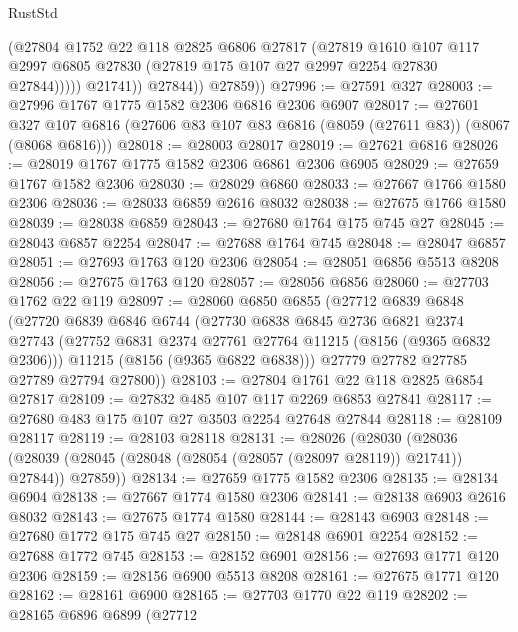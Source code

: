 \begin{lexlean}{RustStd}
\begin{coremodule}
{\begin{coremodule}
{{{{{{{{{{{{{{{{{{{{{{{{{{{{{{{{{{                    (@27804
                      @1752
                      @22
                      @118
                      @2825
                      @6806
                      @27817
                      (@27819
                        @1610
                        @107
                        @117
                        @2997
                        @6805
                        @27830
                        (@27819 @175 @107 @27 @2997 @2254 @27830 @27844)))))
                @21741))
            @27844))
        @27859))
@27996 := @27591 @327
@28003 := @27996 @1767 @1775 @1582 @2306 @6816 @2306 @6907
@28017 := @27601
    @327
    @107
    @6816
    (@27606 @83 @107 @83 @6816 (@8059 (@27611 @83)) (@8067 (@8068 @6816)))
@28018 := @28003 @28017
@28019 := @27621 @6816
@28026 := @28019 @1767 @1775 @1582 @2306 @6861 @2306 @6905
@28029 := @27659 @1767 @1582 @2306
@28030 := @28029 @6860
@28033 := @27667 @1766 @1580 @2306
@28036 := @28033 @6859 @2616 @8032
@28038 := @27675 @1766 @1580
@28039 := @28038 @6859
@28043 := @27680 @1764 @175 @745 @27
@28045 := @28043 @6857 @2254
@28047 := @27688 @1764 @745
@28048 := @28047 @6857
@28051 := @27693 @1763 @120 @2306
@28054 := @28051 @6856 @5513 @8208
@28056 := @27675 @1763 @120
@28057 := @28056 @6856
@28060 := @27703 @1762 @22 @119
@28097 := @28060
    @6850
    @6855
    (@27712
      @6839
      @6848
      (@27720
        @6839
        @6846
        @6744
        (@27730
          @6838
          @6845
          @2736
          @6821
          @2374
          @27743
          (@27752 @6831 @2374 @27761 @27764 @11215 (@8156 (@9365 @6832 @2306)))
          @11215
          (@8156 (@9365 @6822 @6838)))
        @27779
        @27782
        @27785
        @27789
        @27794
        @27800))
@28103 := @27804 @1761 @22 @118 @2825 @6854 @27817
@28109 := @27832 @485 @107 @117 @2269 @6853 @27841
@28117 := @27680 @483 @175 @107 @27 @3503 @2254 @27648 @27844
@28118 := @28109 @28117
@28119 := @28103 @28118
@28131 := @28026
    (@28030
      (@28036 (@28039 (@28045 (@28048 (@28054 (@28057 (@28097 @28119)) @21741)) @27844)) @27859))
@28134 := @27659 @1775 @1582 @2306
@28135 := @28134 @6904
@28138 := @27667 @1774 @1580 @2306
@28141 := @28138 @6903 @2616 @8032
@28143 := @27675 @1774 @1580
@28144 := @28143 @6903
@28148 := @27680 @1772 @175 @745 @27
@28150 := @28148 @6901 @2254
@28152 := @27688 @1772 @745
@28153 := @28152 @6901
@28156 := @27693 @1771 @120 @2306
@28159 := @28156 @6900 @5513 @8208
@28161 := @27675 @1771 @120
@28162 := @28161 @6900
@28165 := @27703 @1770 @22 @119
@28202 := @28165
    @6896
    @6899
    (@27712
}}}}}}}}}}}}}}}}}}}}}}}}}}}}}}}}}}
\end{coremodule}}
\end{coremodule}
\end{lexlean}
